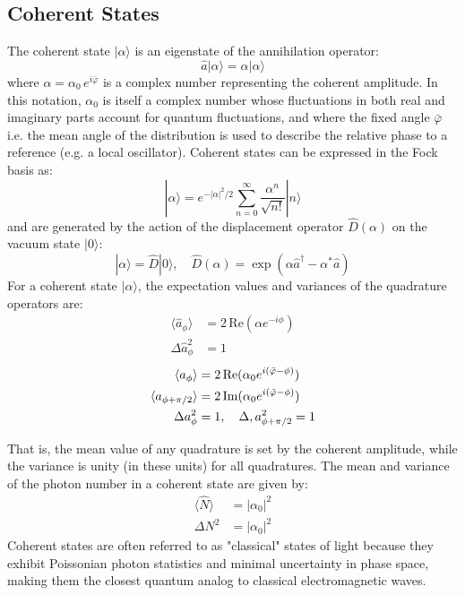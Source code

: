 \subsection*{Coherent States}
The coherent state $|\alpha\rangle$ is an eigenstate of the annihilation operator:
\begin{equation}
\hat{a}|\alpha\rangle = \alpha|\alpha\rangle
\end{equation}
where $\alpha = \alpha_0\, e^{i\bar{\varphi}}$ is a complex number representing the coherent amplitude. In this notation, $\alpha_0$ is itself a complex number whose fluctuations in both real and imaginary parts account for quantum fluctuations, and where the fixed angle $\bar{\varphi}$ i.e. the mean angle of the distribution is used to describe the relative phase to a reference (e.g. a local oscillator). Coherent states can be expressed in the Fock basis as: 
\begin{equation}
|\alpha\rangle = e^{-|\alpha|^2/2} \sum_{n=0}^{\infty} \frac{\alpha^n}{\sqrt{n!}} |n\rangle
\end{equation}
and are generated by the action of the displacement operator $\hat{D}(\alpha)$ on the vacuum state $|0\rangle$:
\begin{equation}
|\alpha\rangle = \hat{D}|0\rangle, \quad \hat{D}(\alpha) = \exp(\alpha \hat{a}^\dagger - \alpha^* \hat{a})
\end{equation}
For a coherent state $|\alpha\rangle$, the expectation values and variances of the quadrature operators are:
\begin{equation}
\begin{aligned}
  \langle \hat{a}_\phi \rangle &= 2\,\mathrm{Re}(\alpha e^{-i\phi}) \\
  \Delta \hat{a}_\phi^2 &= 1
\end{aligned}
\end{equation}
\begin{equation}
\begin{aligned}
  \langle a_{\phi \vphantom{\pi/2}} \rangle &= 2\,\mathrm{Re}(\alpha_0 e^{i(\bar{\varphi}-\phi)}) \\
  \langle a_{\phi+\pi/2} \rangle &= 2\,\mathrm{Im}(\alpha_0 e^{i(\bar{\varphi}-\phi)}) \\
    \Delta a_{\phi \vphantom{+\pi/2}}^2 &= 1, \quad \Delta , a_{\phi+\pi/2}^2 = 1
\end{aligned}
\end{equation}

That is, the mean value of any quadrature is set by the coherent amplitude, while the variance is unity (in these units) for all quadratures. The mean and variance of the photon number in a coherent state are given by: 
\begin{equation}
  \begin{split}
    \langle \hat{N} \rangle &= |\alpha_0|^2 \\
    \Delta N ^2 &= |\alpha_0|^2
  \end{split}
\end{equation}
Coherent states are often referred to as "classical" states of light because they exhibit Poissonian photon statistics and minimal uncertainty in phase space, making them the closest quantum analog to classical electromagnetic waves. \\

